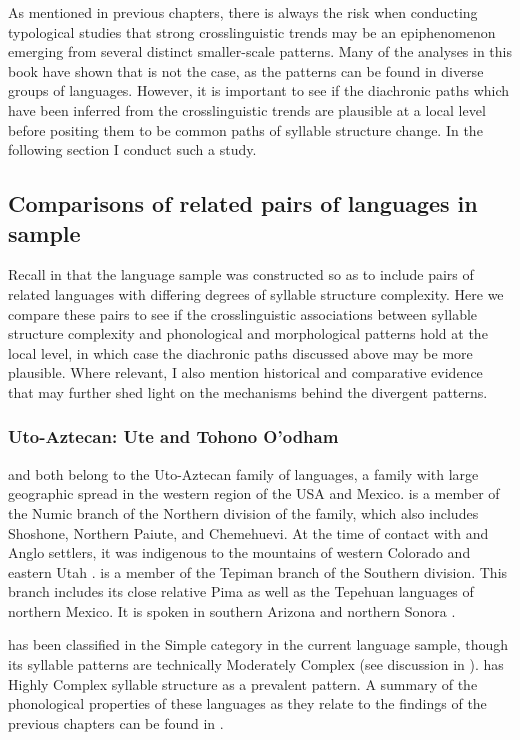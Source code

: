   As mentioned in previous chapters, there is always the risk when conducting typological studies that strong crosslinguistic trends may be an epiphenomenon emerging from several distinct smaller-scale patterns. Many of the analyses in this book have shown that is not the case, as the patterns can be found in diverse groups of languages. However, it is important to see if the diachronic paths which have been inferred from the crosslinguistic trends are plausible at a local level before positing them to be common paths of syllable structure change. In the following section I conduct such a study.

\subsection{Comparisons of related pairs of languages in sample}\label{sec:8.4.3}

  Recall in  that the language sample was constructed so as to include pairs of related languages with differing degrees of syllable structure complexity. Here we compare these pairs to see if the crosslinguistic associations between syllable structure complexity and phonological and morphological patterns hold at the local level, in which case the diachronic paths discussed above may be more plausible. Where relevant, I also mention historical and comparative evidence that may further shed light on the mechanisms behind the divergent patterns.

\subsubsection{{Uto-Aztecan:} {Ute} {and} {Tohono} {O’odham}}\label{sec:8.4.3.1}

   and  both belong to the Uto-Aztecan family of languages, a family with large geographic spread in the western region of the USA and Mexico.  is a member of the Numic branch of the Northern division of the family, which also includes Shoshone, Northern Paiute, and Chemehuevi. At the time of contact with  and Anglo settlers, it was indigenous to the mountains of western Colorado and eastern Utah \citep{Givón2011}.  is a member of the Tepiman branch of the Southern division. This branch includes its close relative Pima as well as the Tepehuan languages of northern Mexico. It is spoken in southern Arizona and northern Sonora \citep{Zepeda1983}.

   has been classified in the Simple category in the current language sample, though its syllable patterns are technically Moderately Complex (see discussion in ).  has Highly Complex syllable structure as a prevalent pattern. A summary of the phonological properties of these languages as they relate to the findings of the previous chapters can be found in .

